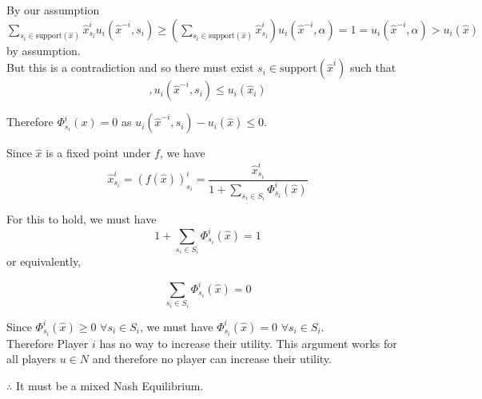 \documentclass[12pt]{article}
\begin{document}
By our assumption $\sum\limits_{s_i \in \text{support}(\hat{x})} \hat{x}^i_{s_i} u_i(\hat{x}^{-i},s_i) \geq (\sum\limits_{s_i \in \text{support}(\hat{x})} \hat{x}^i_{s_i})u_i(\hat{x}^{-i}, \alpha) = 1 = u_i(\hat{x}^{-i}, \alpha) > u_i(\hat{x})$ by assumption.\\

But this is a contradiction and so there must exist $s_i \in \text{support}(\hat{x}^i)$ such that 
\begin{equation*},
u_i(\hat{x}^{-i},s_i) \leq u_i(\hat{x}_i)
\end{equation*}

Therefore $\Phi^i_{s_i}(x) = 0$ as $u_i(\hat{x}^{-i},s_i) - u_i(\hat{x}) \leq 0$.

Since $\hat{x}$ is a fixed point under $f$, we have 
\begin{equation*}
\hat{x}^i_{s_i} = (f(\hat{x}))^i_{s_i} = \dfrac{\hat{x}^i_{s_i}}{1 + \sum\limits_{s_i \in S_i} \Phi^i_{s_i}(\hat{x})}
\end{equation*}
 
For this to hold, we must have
\begin{equation*}
1 + \sum\limits_{s_i \in S_i} \Phi^i_{s_i}(\hat{x}) = 1
\end{equation*}
or equivalently,

\begin{equation*}
\sum\limits_{s_i \in S_i} \Phi^i_{s_i}(\hat{x}) = 0
\end{equation*}

Since $\Phi^i_{s_i}(\hat{x}) \geq 0$ $\forall s_i \in S_i$, we must have $\Phi^i_{s_i}(\hat{x}) = 0$ $\forall s_i \in S_i$.\\

Therefore Player $i$ has no way to increase their utility. This argument works for all players $u \in N$ and therefore no player can increase their utility.

$\therefore$ It must be a mixed Nash Equilibrium.
\end{document}
